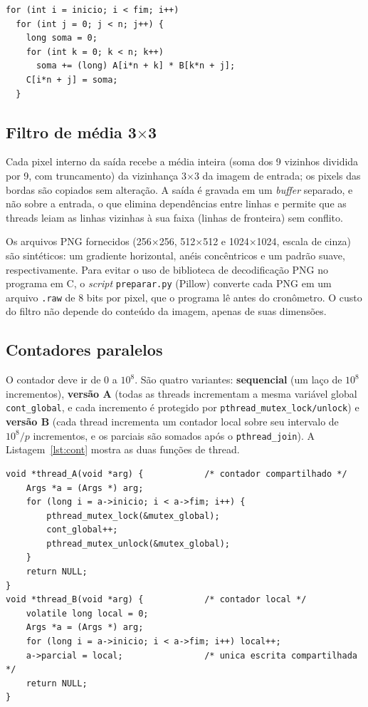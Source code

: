 \documentclass[12pt,a4paper]{article}
\newcommand{\tx}{$\times$}
\begin{document}
\begin{lstlisting}[float=tp,caption={Núcleo de \texttt{mult\_seq}, usado nas versões sequencial (\texttt{inicio}=0, \texttt{fim}=$n$) e paralela.},label={lst:mm}]
for (int i = inicio; i < fim; i++)
  for (int j = 0; j < n; j++) {
    long soma = 0;
    for (int k = 0; k < n; k++)
      soma += (long) A[i*n + k] * B[k*n + j];
    C[i*n + j] = soma;
  }
\end{lstlisting}

\subsection{Filtro de média 3\tx3}

Cada pixel interno da saída recebe a média inteira (soma dos 9 vizinhos dividida por 9, com truncamento) da vizinhança 3\tx3 da imagem de entrada; os pixels das bordas são copiados sem alteração. A saída é gravada em um \emph{buffer} separado, e não sobre a entrada, o que elimina dependências entre linhas e permite que as threads leiam as linhas vizinhas à sua faixa (linhas de fronteira) sem conflito.

Os arquivos PNG fornecidos (256\tx256, 512\tx512 e 1024\tx1024, escala de cinza) são sintéticos: um gradiente horizontal, anéis concêntricos e um padrão suave, respectivamente. Para evitar o uso de biblioteca de decodificação PNG no programa em C, o \emph{script} \texttt{preparar.py} (Pillow) converte cada PNG em um arquivo \texttt{.raw} de 8 bits por pixel, que o programa lê antes do cronômetro. O custo do filtro não depende do conteúdo da imagem, apenas de suas dimensões.

\subsection{Contadores paralelos}

O contador deve ir de 0 a $10^8$. São quatro variantes: \textbf{sequencial} (um laço de $10^8$ incrementos), \textbf{versão A} (todas as threads incrementam a mesma variável global \texttt{cont\_global}, e cada incremento é protegido por \texttt{pthread\_mutex\_lock/unlock}) e \textbf{versão B} (cada thread incrementa um contador local sobre seu intervalo de $10^8/p$ incrementos, e os parciais são somados após o \texttt{pthread\_join}). A Listagem~\ref{lst:cont} mostra as duas funções de thread.

\begin{lstlisting}[float=tp,caption={Funções executadas pelas threads nas versões A e B dos contadores.},label={lst:cont}]
void *thread_A(void *arg) {            /* contador compartilhado */
    Args *a = (Args *) arg;
    for (long i = a->inicio; i < a->fim; i++) {
        pthread_mutex_lock(&mutex_global);
        cont_global++;
        pthread_mutex_unlock(&mutex_global);
    }
    return NULL;
}
void *thread_B(void *arg) {            /* contador local */
    volatile long local = 0;
    Args *a = (Args *) arg;
    for (long i = a->inicio; i < a->fim; i++) local++;
    a->parcial = local;                /* unica escrita compartilhada */
    return NULL;
}
\end{lstlisting}
\end{document}
